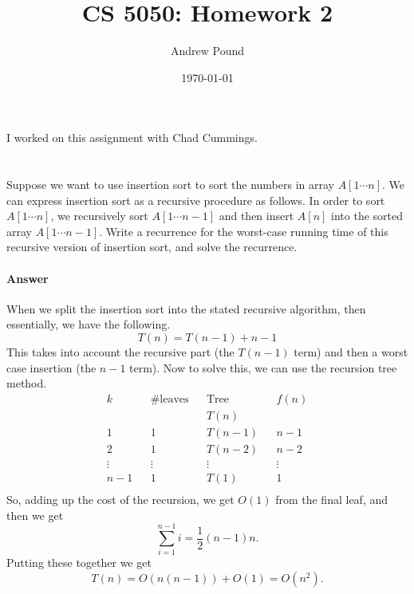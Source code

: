\documentclass{article}
\title{CS 5050: Homework 2}
\author{Andrew Pound}
\date{\today}
\begin{document}
\maketitle

I worked on this assignment with Chad Cummings.
\section{}
 Suppose we want to use insertion sort to sort the numbers in array
 $A[ 1\cdots n ]$. We can express insertion sort as a recursive
 procedure as follows. In order to sort $ A[1\cdots n]$, we
 recursively sort $A[1\cdots n-1]$ and then insert $A[n]$ into the
 sorted array $A[1\cdots n-1]$. Write a  recurrence for the worst-case
 running time of this recursive version of insertion sort, and solve
 the recurrence. 

\paragraph{Answer}
When we split the insertion sort into the stated recursive algorithm,
then essentially, we have the following.
\begin{equation}
  T(n) = T(n-1) + n-1
\end{equation}
This takes into account the recursive part (the $T(n-1)$ term) and
then a worst case insertion (the $n-1$ term).
Now to solve this, we can use the recursion tree method.
\begin{align*}
  k && \text{\# leaves}& & \text{Tree}&& f(n)\\
  &&&&T(n)&&\\
  1&&1&&T(n-1)&&n-1\\
  2&&1&&T(n-2)&&n-2\\
  \vdots&&\vdots&&\vdots&&\vdots\\
  n-1&&1&&T(1)&&1\\
\end{align*}
So, adding up the cost of the recursion, we get $O(1)$ from the final
leaf, and then we get 
\begin{equation}
  \sum_{i = 1}^{n-1}i = \frac{1}{2}(n-1)n.
\end{equation}
Putting these together we get
\begin{equation}
  T(n) = O( n(n-1) ) + O(1) = O(n^2).
\end{equation}
\end{document}
